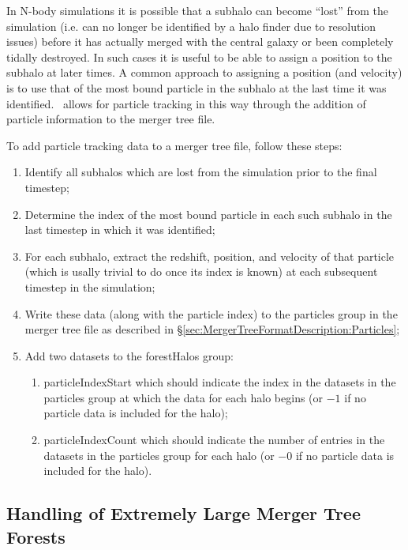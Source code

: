 In N-body simulations it is possible that a subhalo can become ``lost'' from the simulation (i.e. can no longer be identified by a halo finder due to resolution issues) before it has actually merged with the central galaxy or been completely tidally destroyed. In such cases it is useful to be able to assign a position to the subhalo at later times. A common approach to assigning a position (and velocity) is to use that of the most bound particle in the subhalo at the last time it was identified. \glc\ allows for particle tracking in this way through the addition of particle information to the merger tree file.

To add particle tracking data to a merger tree file, follow these steps:
\begin{enumerate}
\item Identify all subhalos which are lost from the simulation prior to the final timestep;
\item Determine the index of the most bound particle in each such subhalo in the last timestep in which it was identified;
\item For each subhalo, extract the redshift, position, and velocity of that particle (which is usally trivial to do once its index is known) at each subsequent timestep in the simulation;
\item Write these data (along with the particle index) to the {\normalfont \ttfamily particles} group in the merger tree file as described in \S\ref{sec:MergerTreeFormatDescription:Particles};
\item Add two datasets to the {\normalfont \ttfamily forestHalos} group:
  \begin{enumerate}
  \item {\normalfont \ttfamily particleIndexStart} which should indicate the index in the datasets in the {\normalfont \ttfamily particles} group at which the data for each halo begins (or $-1$ if no particle data is included for the halo);
  \item {\normalfont \ttfamily particleIndexCount} which should indicate the number of entries in the datasets in the {\normalfont \ttfamily particles} group for each halo (or $-0$ if no particle data is included for the halo).
  \end{enumerate}
\end{enumerate}

\subsection{Handling of Extremely Large Merger Tree Forests}

